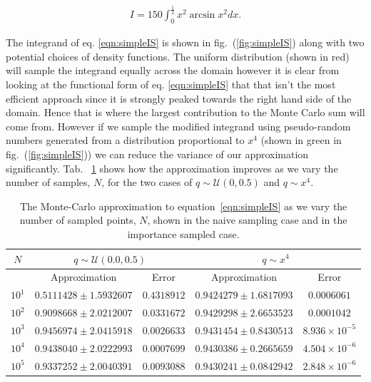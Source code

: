 	\begin{align}
		I = 150\int_{0}^{\frac{1}{2}}x^2\arcsin x^2dx.
		\label{eqn:simpleIS}
	\end{align}

	The integrand of eq. \ref{eqn:simpleIS} is shown in fig.~(\ref{fig:simpleIS}) along with two potential choices of density functions.
	The uniform distribution (shown in red) will sample the integrand equally across the domain however it is clear from looking
	at the functional form of eq. \ref{eqn:simpleIS} that that isn't the most efficient approach since it is strongly peaked towards the
	right hand side of the domain.  Hence that is where the largest contribution to the Monte Carlo sum will come from.  However if we sample
	the modified integrand using pseudo-random numbers generated from a distribution proportional to $x^4$ (shown in green in fig.~(\ref{fig:simpleIS}))
	we can reduce the variance of our approximation significantly.  Tab. ~\ref{tab:simpleIS} shows how the approximation improves as we vary
	the number of samples, $N$, for the two cases of $q\sim\mathcal{U}(0,0.5)$ and $q\sim x^4$.

	\begin{table}[htp]
		\begin{center}
		\begin{tabular}{c | c | c | c | c}
		$N$       & \multicolumn{2}{c|}{$q\sim\mathcal{U}(0.0,0.5)$} & \multicolumn{2}{c}{$q\sim x^4$} \\ \hline
		          & Approximation & Error       & Approximation & Error       \\ \hline
		$10^1$    & $0.5111428 \pm 1.5932607$ & $0.4318912$ & $0.9424279 \pm 1.6817093$ & $0.0006061$ \\
		$10^2$    & $0.9098668 \pm 2.0212007$ & $0.0331672$ & $0.9429298 \pm 2.6653523$ & $0.0001042$ \\
		$10^3$    & $0.9456974 \pm 2.0415918$ & $0.0026633$ & $0.9431454 \pm 0.8430513$ & $8.936\times10^{-5}$ \\
		$10^4$    & $0.9438040 \pm 2.0222993$ & $0.0007699$ & $0.9430386 \pm 0.2665659$ & $4.504\times10^{-6}$ \\
		$10^5$    & $0.9337252 \pm 2.0040391$ & $0.0093088$ & $0.9430241 \pm 0.0842942$ & $2.848\times10^{-6}$ \\
		\end{tabular}
		\caption{The Monte-Carlo approximation to equation~\ref{eqn:simpleIS} as we vary the number of sampled points, $N$, shown in
		the naive sampling case and in the importance sampled case.}
		\label{tab:simpleIS}
		\end{center}
	\end{table}

